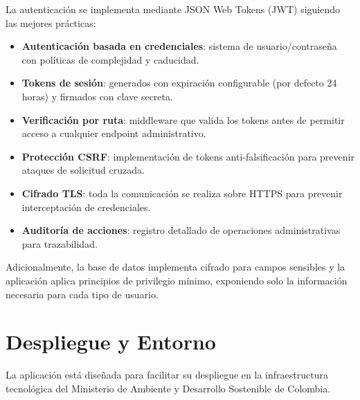 \documentclass[12pt,a4paper]{report}
\begin{document}
La autenticación se implementa mediante JSON Web Tokens (JWT) siguiendo las mejores prácticas:
\begin{itemize}[leftmargin=*]
    \item \textbf{Autenticación basada en credenciales}: sistema de usuario/contraseña con políticas de complejidad y caducidad.
    \item \textbf{Tokens de sesión}: generados con expiración configurable (por defecto 24 horas) y firmados con clave secreta.
    \item \textbf{Verificación por ruta}: middleware que valida los tokens antes de permitir acceso a cualquier endpoint administrativo.
    \item \textbf{Protección CSRF}: implementación de tokens anti-falsificación para prevenir ataques de solicitud cruzada.
    \item \textbf{Cifrado TLS}: toda la comunicación se realiza sobre HTTPS para prevenir interceptación de credenciales.
    \item \textbf{Auditoría de acciones}: registro detallado de operaciones administrativas para trazabilidad.
\end{itemize}

Adicionalmente, la base de datos implementa cifrado para campos sensibles y la aplicación aplica principios de privilegio mínimo, exponiendo solo la información necesaria para cada tipo de usuario.

\chapter{Despliegue y Entorno}
La aplicación está diseñada para facilitar su despliegue en la infraestructura tecnológica del Ministerio de Ambiente y Desarrollo Sostenible de Colombia.
\end{document}
